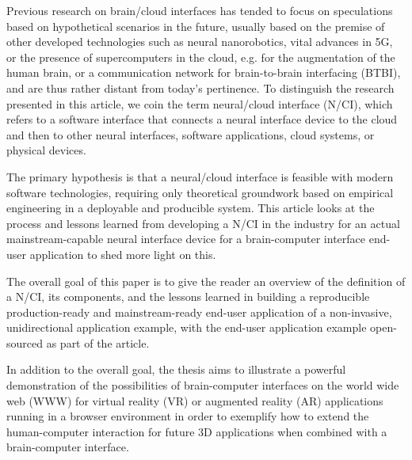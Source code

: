 Previous research on brain/cloud interfaces has tended to focus on speculations based on hypothetical scenarios in the future, usually based on the premise of other developed technologies such as neural nanorobotics, vital advances in 5G, or the presence of supercomputers in the cloud, e.g. for the augmentation of the human brain, or a communication network for brain-to-brain interfacing (BTBI), and are thus rather distant from today's pertinence. To distinguish the research presented in this article, we coin the term neural/cloud interface (N/CI), which refers to a software interface that connects a neural interface device to the cloud and then to other neural interfaces, software applications, cloud systems, or physical devices.

The primary hypothesis is that a neural/cloud interface is feasible with modern software technologies, requiring only theoretical groundwork based on empirical engineering in a deployable and producible system. This article looks at the process and lessons learned from developing a N/CI in the industry for an actual mainstream-capable neural interface device for a brain-computer interface end-user application to shed more light on this.

The overall goal of this paper is to give the reader an overview of the definition of a N/CI, its components, and the lessons learned in building a reproducible production-ready and mainstream-ready end-user application of a non-invasive, unidirectional application example, with the end-user application example open-sourced as part of the article.

In addition to the overall goal, the thesis aims to illustrate a powerful demonstration of the possibilities of brain-computer interfaces on the world wide web (WWW) for virtual reality (VR) or augmented reality (AR) applications running in a browser environment in order to exemplify how to extend the human-computer interaction for future 3D applications when combined with a brain-computer interface.

